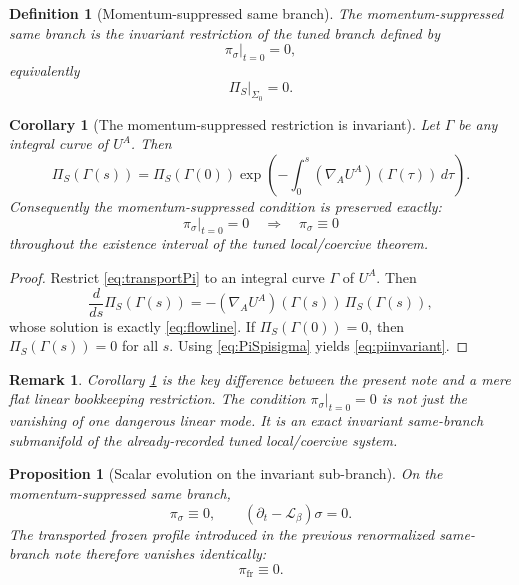 \documentclass[11pt]{article}
\newcommand{\Ell}{\mathcal{L}}
\newtheorem{definition}{Definition}
\newtheorem{proposition}{Proposition}
\newtheorem{remark}{Remark}
\newtheorem{corollary}{Corollary}
\begin{document}
\begin{definition}[Momentum-suppressed same branch]
\label{def:mssb}
The \emph{momentum-suppressed same branch} is the invariant restriction of the tuned branch defined by
\begin{equation}
\pi_\sigma|_{t=0}=0,
\label{eq:msinitial}
\end{equation}
equivalently
\begin{equation}
\Pi_S|_{\Sigma_0}=0.
\label{eq:msinitialPi}
\end{equation}
\end{definition}

\begin{corollary}[The momentum-suppressed restriction is invariant]
\label{cor:invariant}
Let \(\Gamma\) be any integral curve of \(U^A\). Then
\begin{equation}
\Pi_S(\Gamma(s))
=
\Pi_S(\Gamma(0))
\exp\!\left(
-\int_0^s (\nabla_AU^A)(\Gamma(\tau))\,d\tau
\right).
\label{eq:flowline}
\end{equation}
Consequently the momentum-suppressed condition is preserved exactly:
\begin{equation}
\pi_\sigma|_{t=0}=0
\quad\Longrightarrow\quad
\pi_\sigma\equiv 0
\label{eq:piinvariant}
\end{equation}
throughout the existence interval of the tuned local/coercive theorem.
\end{corollary}

\begin{proof}
Restrict \eqref{eq:transportPi} to an integral curve \(\Gamma\) of \(U^A\). Then
\[
\frac{d}{ds}\Pi_S(\Gamma(s))
=
-(\nabla_AU^A)(\Gamma(s))\,\Pi_S(\Gamma(s)),
\]
whose solution is exactly \eqref{eq:flowline}. If \(\Pi_S(\Gamma(0))=0\), then \(\Pi_S(\Gamma(s))=0\) for all \(s\). Using \eqref{eq:PiSpisigma} yields \eqref{eq:piinvariant}.
\end{proof}

\begin{remark}
Corollary \ref{cor:invariant} is the key difference between the present note and a mere flat linear bookkeeping restriction. The condition \(\pi_\sigma|_{t=0}=0\) is not just the vanishing of one dangerous linear mode. It is an exact invariant same-branch submanifold of the already-recorded tuned local/coercive system.
\end{remark}

\begin{proposition}[Scalar evolution on the invariant sub-branch]
\label{prop:sigmapassive}
On the momentum-suppressed same branch,
\begin{equation}
\pi_\sigma\equiv 0,
\qquad
(\partial_t-\Ell_\beta)\sigma=0.
\label{eq:sigmapassive}
\end{equation}
The transported frozen profile introduced in the previous renormalized same-branch note therefore vanishes identically:
\begin{equation}
\pi_{\mathrm{fr}}\equiv 0.
\label{eq:pifrzero}
\end{equation}
\end{proposition}
\end{document}
